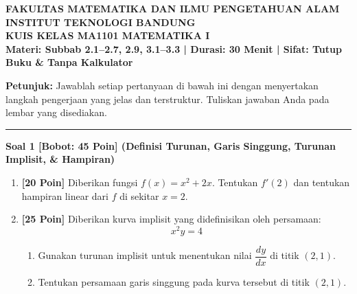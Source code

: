 \documentclass[11pt,a4paper]{article}
\begin{document}
\begin{center}
    {\large \textbf{FAKULTAS MATEMATIKA DAN ILMU PENGETAHUAN ALAM}}\\
    {\large \textbf{INSTITUT TEKNOLOGI BANDUNG}}\\[4pt]
    {\large \textbf{KUIS KELAS MA1101 MATEMATIKA I}}\\[2pt]
    \textbf{Materi: Subbab 2.1--2.7, 2.9, 3.1--3.3 \quad | \quad Durasi: 30 Menit \quad | \quad Sifat: Tutup Buku \& Tanpa Kalkulator}
\end{center}

\vspace{2pt}
\noindent{}

\vspace{10pt}
\noindent\textbf{Petunjuk:} Jawablah setiap pertanyaan di bawah ini dengan menyertakan langkah pengerjaan yang jelas dan terstruktur. Tuliskan jawaban Anda pada lembar yang disediakan.

\vspace{8pt}
\hrule
\vspace{10pt}

\noindent\textbf{Soal 1 [Bobot: 45 Poin] (Definisi Turunan, Garis Singgung, Turunan Implisit, \& Hampiran)}
\begin{enumerate}[label=(\alph*), leftmargin=24pt]
    \item \textbf{[20 Poin]} Diberikan fungsi $f(x) = x^2 + 2x$. Tentukan $f'(2)$ dan tentukan hampiran linear dari $f$ di sekitar $x=2$.
    \item \textbf{[25 Poin]} Diberikan kurva implisit yang didefinisikan oleh persamaan:
    \[
    x^2 y = 4
    \]
    \begin{enumerate}[label=(\roman*)]
        \item Gunakan turunan implisit untuk menentukan nilai $\dfrac{dy}{dx}$ di titik $(2, 1)$.
        \item Tentukan persamaan garis singgung pada kurva tersebut di titik $(2, 1)$.
    \end{enumerate}
\end{enumerate}
\end{document}
